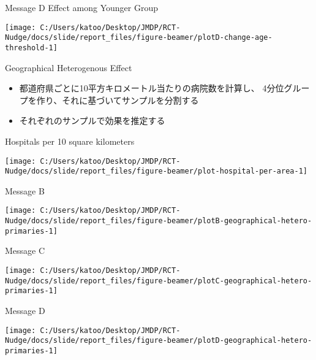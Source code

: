 \documentclass[
      aspectratio=169,
        12pt,
    ]{beamer}
\providecommand{\tightlist}{%
  \setlength{\itemsep}{0pt}\setlength{\parskip}{0pt}}
\begin{document}
\begin{frame}{Message D Effect among Younger Group}
\protect\hypertarget{message-d-effect-among-younger-group}{}
\begin{center}\texttt{[image: C:/Users/katoo/Desktop/JMDP/RCT-Nudge/docs/slide/report\_files/figure-beamer/plotD-change-age-threshold-1]} \end{center}
\end{frame}

\begin{frame}{Geographical Heterogenous Effect}
\protect\hypertarget{geographical-heterogenous-effect}{}
\begin{itemize}
\tightlist
\item
  都道府県ごとに10平方キロメートル当たりの病院数を計算し、
  4分位グループを作り、それに基づいてサンプルを分割する
\item
  それぞれのサンプルで効果を推定する
\end{itemize}
\end{frame}

\begin{frame}{Hospitals per 10 square kilometers}
\protect\hypertarget{hospitals-per-10-square-kilometers}{}
\begin{center}\texttt{[image: C:/Users/katoo/Desktop/JMDP/RCT-Nudge/docs/slide/report\_files/figure-beamer/plot-hospital-per-area-1]} \end{center}
\end{frame}

\begin{frame}{Message B}
\protect\hypertarget{message-b-1}{}
\begin{center}\texttt{[image: C:/Users/katoo/Desktop/JMDP/RCT-Nudge/docs/slide/report\_files/figure-beamer/plotB-geographical-hetero-primaries-1]} \end{center}
\end{frame}

\begin{frame}{Message C}
\protect\hypertarget{message-c-1}{}
\begin{center}\texttt{[image: C:/Users/katoo/Desktop/JMDP/RCT-Nudge/docs/slide/report\_files/figure-beamer/plotC-geographical-hetero-primaries-1]} \end{center}
\end{frame}

\begin{frame}{Message D}
\protect\hypertarget{message-d-1}{}
\begin{center}\texttt{[image: C:/Users/katoo/Desktop/JMDP/RCT-Nudge/docs/slide/report\_files/figure-beamer/plotD-geographical-hetero-primaries-1]} \end{center}
\end{frame}
\end{document}
